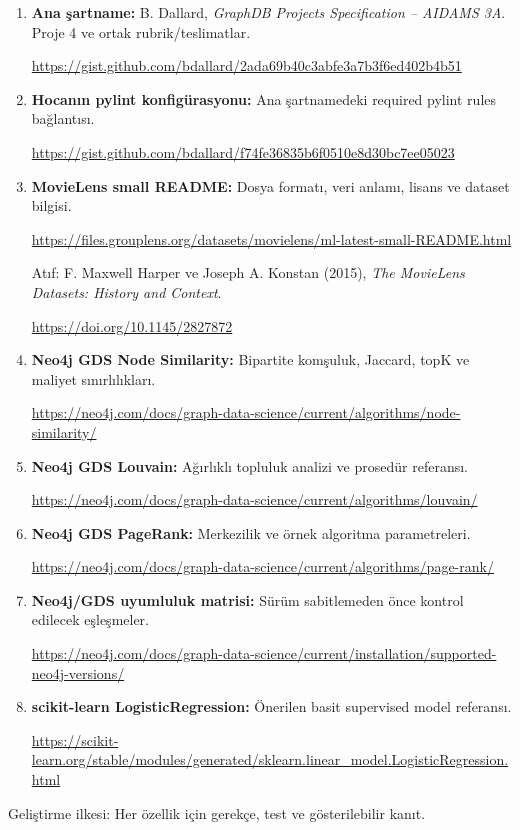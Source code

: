 \documentclass[11pt,a4paper]{article}
\begin{document}
\begin{enumerate}[label=K\arabic*.,leftmargin=12mm]
\item \textbf{Ana şartname:} B. Dallard, \emph{GraphDB Projects Specification -- AIDAMS 3A}. Proje 4 ve ortak rubrik/teslimatlar.\par
\url{https://gist.github.com/bdallard/2ada69b40c3abfe3a7b3f6ed402b4b51}
\item \textbf{Hocanın pylint konfigürasyonu:} Ana şartnamedeki required pylint rules bağlantısı.\par
\url{https://gist.github.com/bdallard/f74fe36835b6f0510e8d30bc7ee05023}
\item \textbf{MovieLens small README:} Dosya formatı, veri anlamı, lisans ve dataset bilgisi.\par
\url{https://files.grouplens.org/datasets/movielens/ml-latest-small-README.html}\par
Atıf: F. Maxwell Harper ve Joseph A. Konstan (2015), \emph{The MovieLens Datasets: History and Context}.\par
\url{https://doi.org/10.1145/2827872}
\item \textbf{Neo4j GDS Node Similarity:} Bipartite komşuluk, Jaccard, topK ve maliyet sınırlılıkları.\par
\url{https://neo4j.com/docs/graph-data-science/current/algorithms/node-similarity/}
\item \textbf{Neo4j GDS Louvain:} Ağırlıklı topluluk analizi ve prosedür referansı.\par
\url{https://neo4j.com/docs/graph-data-science/current/algorithms/louvain/}
\item \textbf{Neo4j GDS PageRank:} Merkezilik ve örnek algoritma parametreleri.\par
\url{https://neo4j.com/docs/graph-data-science/current/algorithms/page-rank/}
\item \textbf{Neo4j/GDS uyumluluk matrisi:} Sürüm sabitlemeden önce kontrol edilecek eşleşmeler.\par
\url{https://neo4j.com/docs/graph-data-science/current/installation/supported-neo4j-versions/}
\item \textbf{scikit-learn LogisticRegression:} Önerilen basit supervised model referansı.\par
\url{https://scikit-learn.org/stable/modules/generated/sklearn.linear_model.LogisticRegression.html}
\end{enumerate}

\vfill
\begin{center}\textcolor{muted}{Geliştirme ilkesi: Her özellik için gerekçe, test ve gösterilebilir kanıt.}\end{center}
\end{document}
